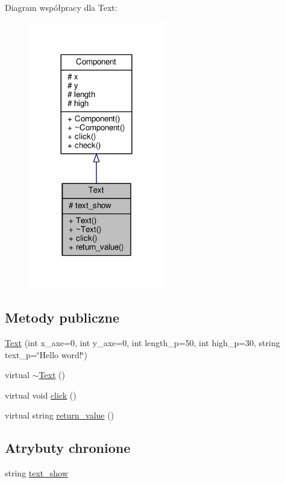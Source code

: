Diagram współpracy dla Text\+:\nopagebreak
\begin{figure}[H]
\begin{center}
\leavevmode
\includegraphics[width=168pt]{classText__coll__graph}
\end{center}
\end{figure}
\subsection*{Metody publiczne}
\begin{DoxyCompactItemize}
\item 
\hyperlink{classText_a144848b3b22ea514fe2f9c61762af5c3}{Text} (int x\+\_\+axe=0, int y\+\_\+axe=0, int length\+\_\+p=50, int high\+\_\+p=30, string text\+\_\+p=\char`\"{}Hello word!\char`\"{})
\item 
virtual \hyperlink{classText_a068e9e04751fc94f4c45c6cb15af55f4}{$\sim$\+Text} ()
\item 
virtual void \hyperlink{classText_ab334ff82f41302f83bebf3eaf2516a84}{click} ()
\item 
virtual string \hyperlink{classText_a6b842bda6a161716fc5aa845fc56187d}{return\+\_\+value} ()
\end{DoxyCompactItemize}
\subsection*{Atrybuty chronione}
\begin{DoxyCompactItemize}
\item 
string \hyperlink{classText_a3fd84b688c6971ba8626b910f0bc2ce3}{text\+\_\+show}
\end{DoxyCompactItemize}



